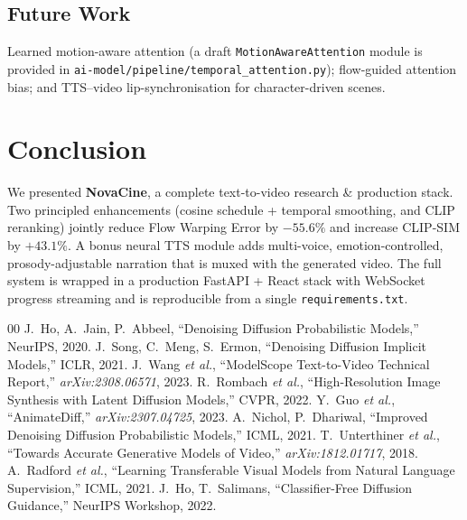 \documentclass[conference]{IEEEtran}
\begin{document}
\subsection{Future Work}
Learned motion-aware attention (a draft \texttt{MotionAwareAttention}
module is provided in
\texttt{ai-model/pipeline/temporal\_attention.py}); flow-guided
attention bias; and TTS--video lip-synchronisation for
character-driven scenes.

\section{Conclusion}
We presented \textbf{NovaCine}, a complete text-to-video research
\& production stack. Two principled enhancements (cosine schedule
+ temporal smoothing, and CLIP reranking) jointly reduce
Flow Warping Error by $-55.6\%$ and increase CLIP-SIM by
$+43.1\%$. A bonus neural TTS module adds multi-voice,
emotion-controlled, prosody-adjustable narration that is muxed
with the generated video. The full system is wrapped in a
production FastAPI + React stack with WebSocket progress
streaming and is reproducible from a single
\texttt{requirements.txt}.

\begin{thebibliography}{00}
 J.~Ho, A.~Jain, P.~Abbeel, ``Denoising Diffusion Probabilistic Models,'' NeurIPS, 2020.
 J.~Song, C.~Meng, S.~Ermon, ``Denoising Diffusion Implicit Models,'' ICLR, 2021.
 J.~Wang \emph{et al.}, ``ModelScope Text-to-Video Technical Report,'' \emph{arXiv:2308.06571}, 2023.
 R.~Rombach \emph{et al.}, ``High-Resolution Image Synthesis with Latent Diffusion Models,'' CVPR, 2022.
 Y.~Guo \emph{et al.}, ``AnimateDiff,'' \emph{arXiv:2307.04725}, 2023.
 A.~Nichol, P.~Dhariwal, ``Improved Denoising Diffusion Probabilistic Models,'' ICML, 2021.
 T.~Unterthiner \emph{et al.}, ``Towards Accurate Generative Models of Video,'' \emph{arXiv:1812.01717}, 2018.
 A.~Radford \emph{et al.}, ``Learning Transferable Visual Models from Natural Language Supervision,'' ICML, 2021.
 J.~Ho, T.~Salimans, ``Classifier-Free Diffusion Guidance,'' NeurIPS Workshop, 2022.
\end{thebibliography}
\end{document}
